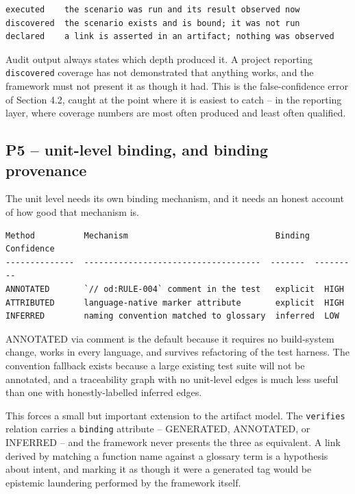 \documentclass[11pt,a4paper]{article}
\begin{document}
\begin{Verbatim}[fontsize=\footnotesize,breaklines=true,breakanywhere=true,breakautoindent=false,samepage=false]
executed    the scenario was run and its result observed now
discovered  the scenario exists and is bound; it was not run
declared    a link is asserted in an artifact; nothing was observed
\end{Verbatim}

Audit output always states which depth produced it. A project reporting \texttt{discovered} coverage has not demonstrated that anything works, and the framework must not present it as though it had. This is the false-confidence error of Section 4.2, caught at the point where it is easiest to catch -- in the reporting layer, where coverage numbers are most often produced and least often qualified.

\subsection{P5 -- unit-level binding, and binding provenance}

The unit level needs its own binding mechanism, and it needs an honest account of how good that mechanism is.

\begin{Verbatim}[fontsize=\footnotesize,breaklines=true,breakanywhere=true,breakautoindent=false,samepage=false]
Method          Mechanism                              Binding  Confidence
--------------  ------------------------------------  -------  ---------
ANNOTATED       `// od:RULE-004` comment in the test   explicit  HIGH
ATTRIBUTED      language-native marker attribute       explicit  HIGH
INFERRED        naming convention matched to glossary  inferred  LOW
\end{Verbatim}

ANNOTATED via comment is the default because it requires no build-system change, works in every language, and survives refactoring of the test harness. The convention fallback exists because a large existing test suite will not be annotated, and a traceability graph with no unit-level edges is much less useful than one with honestly-labelled inferred edges.

This forces a small but important extension to the artifact model. The \texttt{verifies} relation carries a \texttt{binding} attribute -- GENERATED, ANNOTATED, or INFERRED -- and the framework never presents the three as equivalent. A link derived by matching a function name against a glossary term is a hypothesis about intent, and marking it as though it were a generated tag would be epistemic laundering performed by the framework itself.
\end{document}
